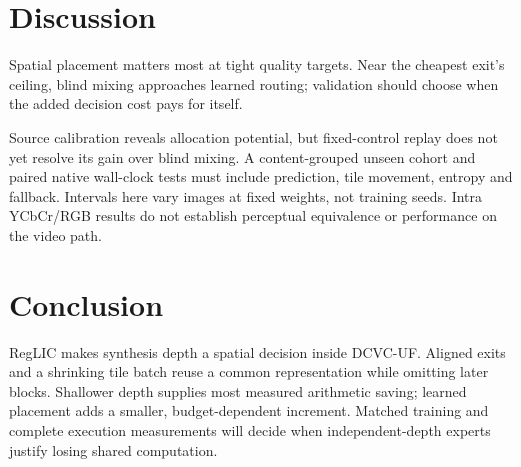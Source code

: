 \section{Discussion}

Spatial placement matters most at tight quality targets. Near the cheapest
exit's ceiling, blind mixing approaches learned routing; validation should
choose when the added decision cost pays for itself.

Source calibration reveals allocation potential, but fixed-control replay
does not yet resolve its gain over blind mixing. A content-grouped unseen
cohort and paired native wall-clock tests must include prediction, tile
movement, entropy and fallback. Intervals here vary images at fixed weights,
not training seeds. Intra YCbCr/RGB results do not establish perceptual
equivalence or performance on the video path.

\section{Conclusion}
RegLIC makes synthesis depth a spatial decision inside DCVC-UF.
Aligned exits and a shrinking tile batch reuse a common representation
while omitting later blocks. Shallower depth supplies most measured arithmetic
saving; learned placement adds a smaller, budget-dependent increment.
Matched training and complete execution measurements will decide when
independent-depth experts justify losing shared computation.
